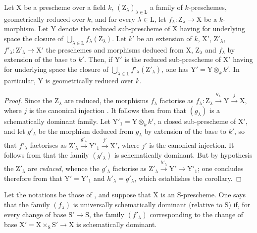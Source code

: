 \begin{corollary}[11.10.7]
\label{IV.11.10.7}
Let $\mathrm{X}$ be a prescheme over a field $k$, $(\mathrm{Z}_\lambda)_{\lambda\in\mathrm{L}}$ a family of $k$-preschemes, geometrically reduced over $k$, and for every $\lambda\in\mathrm{L}$, let $f_\lambda:\mathrm{Z}_\lambda\to\mathrm{X}$ be a $k$-morphism.
Let $\mathrm{Y}$ denote the reduced sub-prescheme of $\mathrm{X}$ having for underlying space the closure of $\bigcup_{\lambda\in\mathrm{L}}f_\lambda(\mathrm{Z}_\lambda)$.
Let $k'$ be an extension of $k$, $\mathrm{X}'$, $\mathrm{Z}'_\lambda$, $f'_\lambda:\mathrm{Z}'_\lambda\to\mathrm{X}'$ the preschemes and morphisms deduced from $\mathrm{X}$, $\mathrm{Z}_\lambda$ and $f_\lambda$ by extension of the base to $k'$.
Then, if $\mathrm{Y}'$ is the reduced sub-prescheme of $\mathrm{X}'$ having for underlying space the closure of $\bigcup_{\lambda\in\mathrm{L}}f'_\lambda(\mathrm{Z}'_\lambda)$, one has $\mathrm{Y}'=\mathrm{Y}\otimes_k k'$.
In particular, $\mathrm{Y}$ is geometrically reduced over $k$.
\end{corollary}

\begin{proof}
Since the $\mathrm{Z}_\lambda$ are reduced, the morphisms $f_\lambda$ factorise as $f_\lambda:\mathrm{Z}_\lambda\xrightarrow{g_\lambda}\mathrm{Y}\xrightarrow{j}\mathrm{X}$, where $j$ is the canonical injection .
It follows then from  that $(g_\lambda)$ is a schematically dominant family.
Let $\mathrm{Y}'_1=\mathrm{Y}\otimes_k k'$, a closed sub-prescheme of $\mathrm{X}'$, and let $g'_\lambda$ be the morphism deduced from $g_\lambda$ by extension of the base to $k'$, so that $f'_\lambda$ factorises as $\mathrm{Z}'_\lambda\xrightarrow{g'_\lambda}\mathrm{Y}'_1\xrightarrow{j'}\mathrm{X}'$, where $j'$ is the canonical injection.
It follows from  that the family $(g'_\lambda)$ is schematically dominant.
But by hypothesis the $\mathrm{Z}'_\lambda$ are \emph{reduced}, whence  the $g'_\lambda$ factorise as $\mathrm{Z}'_\lambda\xrightarrow{h'_\lambda}\mathrm{Y}'\to\mathrm{Y}'_1$; one concludes therefore from  that $\mathrm{Y}'=\mathrm{Y}'_1$ and $h'_\lambda=g'_\lambda$, which establishes the corollary.
\end{proof}

\begin{definition}[11.10.8]
\label{IV.11.10.8}
Let the notations be those of , and suppose that $\mathrm{X}$ is an $\mathrm{S}$-prescheme.
One says that the family $(f_\lambda)$ is universally schematically dominant (relative to $\mathrm{S}$) if, for every change of base $\mathrm{S}'\to\mathrm{S}$, the family $(f'_\lambda)$ corresponding to the change of base $\mathrm{X}'=\mathrm{X}\times_\mathrm{S}\mathrm{S}'\to\mathrm{X}$ is schematically dominant.
\end{definition}

